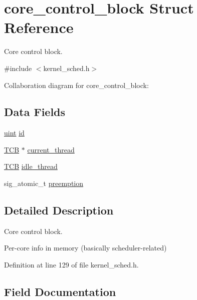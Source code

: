\hypertarget{structcore__control__block}{}\section{core\+\_\+control\+\_\+block Struct Reference}
\label{structcore__control__block}


Core control block.  




{\ttfamily \#include $<$kernel\+\_\+sched.\+h$>$}



Collaboration diagram for core\+\_\+control\+\_\+block\+:
\subsection*{Data Fields}
\begin{DoxyCompactItemize}
\item 
\hyperlink{bios_8h_a91ad9478d81a7aaf2593e8d9c3d06a14}{uint} \hyperlink{structcore__control__block_a5208867f309bdd1656fd473f38b30bfe}{id}
\item 
\hyperlink{group__scheduler_gaf88d9c946bf70b36a1e8bc34383abfc9}{T\+CB} $\ast$ \hyperlink{structcore__control__block_aac649db5b9a99e693ed21c7e610834bf}{current\+\_\+thread}
\item 
\hyperlink{group__scheduler_gaf88d9c946bf70b36a1e8bc34383abfc9}{T\+CB} \hyperlink{structcore__control__block_a6dd29dab4a95ce740f45370345408c52}{idle\+\_\+thread}
\item 
sig\+\_\+atomic\+\_\+t \hyperlink{structcore__control__block_a858cde45d4478d73f60e839594b363f4}{preemption}
\end{DoxyCompactItemize}


\subsection{Detailed Description}
Core control block. 

Per-\/core info in memory (basically scheduler-\/related) 

Definition at line 129 of file kernel\+\_\+sched.\+h.



\subsection{Field Documentation}
\mbox{\label{structcore__control__block_aac649db5b9a99e693ed21c7e610834bf}} 
